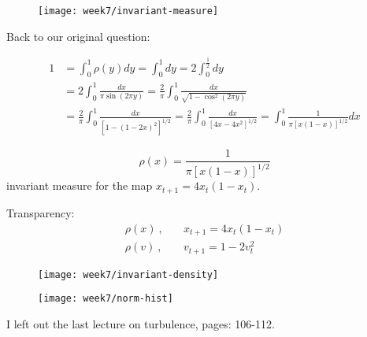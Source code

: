 \begin{figure}[h]
    \centering
    \texttt{[image: week7/invariant-measure]}\\
    \caption{}
    \label{fig:invariant-measure}
\end{figure}

Back to our original question:

\begin{align}
1 &= \int_0^1\rho(y) dy = \int_0^1dy=2\int_0^\frac{1}{2}dy\\
&= 2\int_0^1\frac{dx}{\pi\sin(2\pi y)} = \frac{2}{\pi}\int_0^1\frac{dx}{\sqrt{1-\cos^2(2\pi y)}}\\
&= \frac{2}{\pi}\int_0^1\frac{dx}{[1-(1-2x)^2]^{1/2}} = \frac{2}{\pi}\int_0^1\frac{dx}{[4x-4x^2]^{1/2}} = \int_0^1\frac{1}{\pi[x(1-x)]^{1/2}}dx
\end{align}

\begin{equation}
\rho(x) = \frac{1}{\pi[x(1-x)]^{1/2}}
\end{equation}
invariant measure for the map $x_{t+1} = 4x_t(1-x_t)$.

Transparency:
\begin{align}
\rho(x)\ ,&\quad x_{t+1}=4x_t(1-x_t)\\
\rho(v)\ ,&\quad v_{t+1}=1-2v_t^2
\end{align}

\begin{figure}[h]
    \centering
    \texttt{[image: week7/invariant-density]}\\
    \caption{}
    \label{fig:invariant-density}
\end{figure}
\begin{figure}[h]
    \centering
    \texttt{[image: week7/norm-hist]}\\
    \caption{}
    \label{fig:norm-hist}
\end{figure}

\newpage
\begin{shaded}
I left out the last lecture on turbulence, pages: 106-112.
\end{shaded}